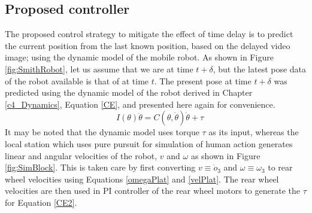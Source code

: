 \subsection{Proposed controller}
The proposed control strategy to mitigate the effect of time delay is to predict the current position from the last known position, based on the delayed video image; using  the dynamic model of the mobile robot.  As shown in Figure \ref{fig:SmithRobot}, let us assume that we are at time $t+\delta$, but the latest pose  data of the robot available is that of at time $t$. The present pose at time $t+\delta$ was predicted  using  the dynamic model  of the robot derived in Chapter \ref{c4_Dynamics}, Equation \ref{CE}, and presented here again for convenience. 
\begin{equation}
\label{CE2}
\quad I(\theta)\ddot{\theta}=C(\theta,\dot{\theta})\dot{\theta}+\tau
\end{equation}
It may be noted that the dynamic model uses torque $\tau$ as its input, whereas the local station which uses pure pursuit for simulation of  human action   generates linear and angular velocities of the robot,  $v$ and $\omega$ as shown in Figure \ref{fig:SimBlock}. This is taken care by first converting $v \equiv\dot o_3$ and $\omega\equiv\omega_3$ to rear wheel velocities using Equations \ref{omegaPlat} and \ref{velPlat}. The rear wheel velocities  are then used in PI controller of the rear wheel motors to generate the $\tau$ for Equation \ref{CE2}.

